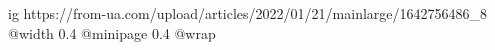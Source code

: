  
 
 
 
 

\ifcmt
	ig https://from-ua.com/upload/articles/2022/01/21/mainlarge/1642756486_8%
  @width 0.4
  @minipage 0.4
  @wrap \parpic[r]
\fi
